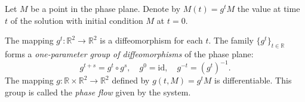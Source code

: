 Let $M$ be a point in the phase plane. Denote by $M(t) = g^t M$ the value at time $t$ of the solution with initial condition $M$ at $t = 0$.

The mapping $g^t: \mathbb{R}^2 \to \mathbb{R}^2$ is a diffeomorphism for each $t$.
The family $\{g^t\}_{t \in \mathbb{R}}$ forms a \textit{one-parameter group of diffeomorphisms} of the phase plane:
$$g^{t+s} = g^t \circ g^s, \quad g^0 = \mathrm{id}, \quad g^{-t} = (g^t)^{-1}.$$
The mapping $g: \mathbb{R} \times \mathbb{R}^2 \to \mathbb{R}^2$ defined by $g(t, M) = g^t M$ is differentiable.
This group is called the \textit{phase flow} given by the system.
